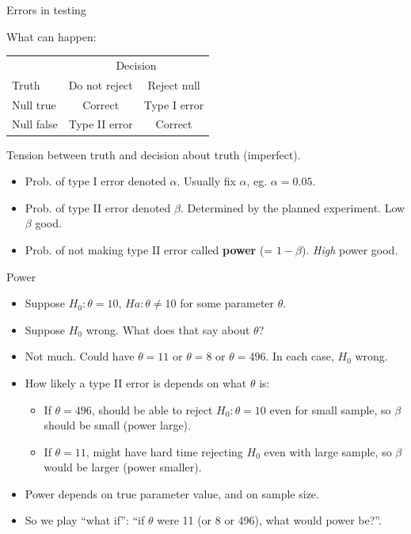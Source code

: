 \documentclass[
  ignorenonframetext,
]{beamer}
\providecommand{\tightlist}{%
  \setlength{\itemsep}{0pt}\setlength{\parskip}{0pt}}
\begin{document}
\begin{frame}{Errors in testing}
\protect\hypertarget{errors-in-testing}{}

What can happen:

\begin{center}
\begin{tabular}{|l|cc|}
\hline
  & \multicolumn{2}{c|}{Decision}\\
Truth & Do not reject & Reject null\\
\hline
Null true & Correct & Type I error\\
Null false & Type II error & Correct\\
\hline
\end{tabular}  
\end{center}

Tension between truth and decision about truth (imperfect).

\begin{itemize}
\tightlist
\item
  Prob. of type I error denoted \(\alpha\). Usually fix \(\alpha\), eg.
  \(\alpha = 0.05\).
\item
  Prob. of type II error denoted \(\beta\). Determined by the planned
  experiment. Low \(\beta\) good.
\item
  Prob. of not making type II error called \textbf{power} (=
  \(1 - \beta\)). \emph{High} power good.
\end{itemize}

\end{frame}

\begin{frame}{Power}
\protect\hypertarget{power}{}

\begin{itemize}
\tightlist
\item
  Suppose \(H_0 : \theta = 10\), \(H a : \theta \ne 10\) for some
  parameter \(\theta\).
\item
  Suppose \(H_0\) wrong. What does that say about \(\theta\)?
\item
  Not much. Could have \(\theta = 11\) or \(\theta = 8\) or
  \(\theta = 496\). In each case, \(H_0\) wrong.
\item
  How likely a type II error is depends on what \(\theta\) is:

  \begin{itemize}
  \tightlist
  \item
    If \(\theta = 496\), should be able to reject \(H_0 : \theta = 10\)
    even for small sample, so \(\beta\) should be small (power large).
  \item
    If \(\theta = 11\), might have hard time rejecting \(H_0\) even with
    large sample, so \(\beta\) would be larger (power smaller).
  \end{itemize}
\item
  Power depends on true parameter value, and on sample size.
\item
  So we play ``what if'': ``if \(\theta\) were 11 (or 8 or 496), what
  would power be?''.
\end{itemize}

\end{frame}
\end{document}
